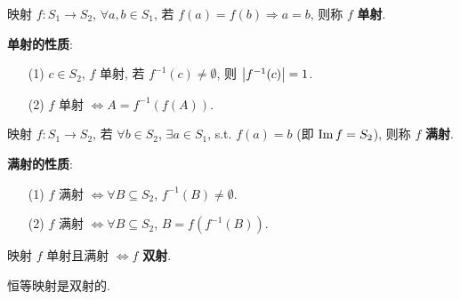 \documentclass{note}
\begin{document}
\begin{df}
    映射 $f:S_1\rightarrow S_2$, $\forall a,b\in S_1$, 若 $f(a)=f(b)\Longrightarrow a=b$, 则称 $f$ \textbf{单射}.
\end{df}

\textbf{单射的性质}:
\begin{itemize}
    \item[(1)] $c\in S_2$, $f$ 单射, 若 $f^{-1}(c)\neq\emptyset$, 则 $\left\lvert f^{-1}(c)\right\rvert=1$.
    \item[(2)] $f$ 单射 $\Longleftrightarrow A=f^{-1}(f(A))$.
\end{itemize}

\begin{df}[满射 (Surjective)]
    映射 $f:S_1\rightarrow S_2$, 若 $\forall b\in S_2$, $\exists a\in S_1$, s.t. $f(a)=b$ (即 $\operatorname{Im} f=S_2$), 则称 $f$ \textbf{满射}.
\end{df}

\textbf{满射的性质}:
\begin{itemize}
    \item[(1)] $f$ 满射 $\Longleftrightarrow\forall B\subseteq S_2$, $f^{-1}(B)\neq\emptyset$.
    \item[(2)] $f$ 满射 $\Longleftrightarrow\forall B\subseteq S_2$, $B=f(f^{-1}(B))$.
\end{itemize}

\begin{df}[双射]
    映射 $f$ 单射且满射 $\Longleftrightarrow f$ \textbf{双射}.
\end{df}

\begin{eg}
    恒等映射是双射的.
\end{eg}
\end{document}
